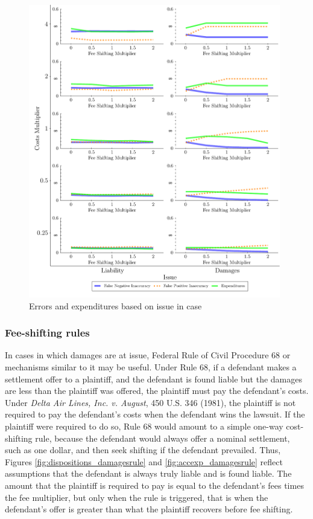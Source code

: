 \documentclass{article}
\begin{document}
\begin{figure}
\begin{minipage}{0.48\textwidth}
        \includegraphics[width=0.98\textwidth, scale=0.70, trim={0in 0in 0in 0in}, clip]{../Figures/Accuracy and Expenditures Varying Issue} %
        \caption{Errors and expenditures based on issue in case}
		\label{fig:accexp_issue}
    \end{minipage}
\end{figure}

\subsubsection{Fee-shifting rules}

In cases in which damages are at issue, Federal Rule of Civil Procedure 68 or mechanisms similar to it may be useful. Under Rule 68, if a defendant makes a settlement offer to a plaintiff, and the defendant is found liable but the damages are less than the plaintiff was offered, the plaintiff must pay the defendant's costs. Under \textit{Delta Air Lines, Inc. v. August}, 450 U.S. 346 (1981), the plaintiff is not required to pay the defendant's costs when the defendant wins the lawsuit. If the plaintiff were required to do so, Rule 68 would amount to a simple one-way cost-shifting rule, because the defendant would always offer a nominal settlement, such as one dollar, and then seek shifting if the defendant prevailed. Thus, Figures \ref{fig:dispositions_damagesrule} and \ref{fig:accexp_damagesrule} reflect assumptions that the defendant is always truly liable and is found liable. The amount that the plaintiff is required to pay is equal to the defendant's fees times the fee multiplier, but only when the rule is triggered, that is when the defendant's offer is greater than what the plaintiff recovers before fee shifting.
\end{document}
